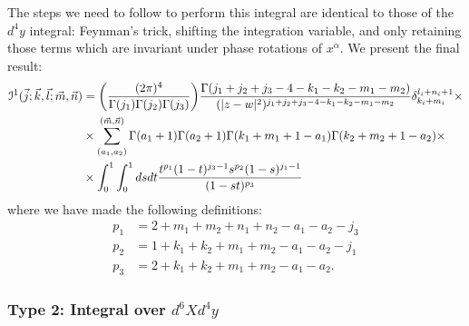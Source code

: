 \documentclass[a4paper,11pt]{article}
\begin{document}
The steps we need to follow to perform this integral are identical to those of the $d^4y$
integral: Feynman’s trick, shifting the integration variable, and only retaining those terms which are invariant under phase rotations of $x^{\dot{\alpha}}$. We present the final result:
\begingroup \allowdisplaybreaks \begin{align}
\mathcal{I}^1(\vec{j};\vec{k},\vec{l};\vec{m}, \vec{n}) &= \bigg(\frac{(2\pi)^4}{\Gamma(j_1) \Gamma(j_2) \Gamma(j_3)}\bigg) \frac{\Gamma(j_1+j_2+j_3-4-k_1-k_2-m_1-m_2)}{(\vert z-w \vert^2)^{j_1+j_2+j_3-4-k_1-k_2-m_1-m_2}} \delta_{k_i+m_i}^{l_i+n_i+1} \times \notag \\
&\times \sum_{(a_1,a_2)}^{(\vec{m},\vec{n})} \Gamma(a_1+1) \Gamma(a_2+1) \Gamma(k_1+m_1+1-a_1) \Gamma(k_2+m_2+1-a_2) \times \notag \\
&\times \int_0^1 \int_0^1 ds dt \frac{t^{p_1} (1-t)^{j_3-1} s^{p_2} (1-s)^{j_1-1}}{(1-st)^{p_3}}
\end{align} \endgroup
where we have made the following definitions:
\begingroup \allowdisplaybreaks \begin{align}
    p_1 &= 2+m_1+m_2+n_1+n_2-a_1-a_2-j_3 \\ p_2 &= 1+k_1+k_2+m_1+m_2-a_1-a_2-j_1 \\ p_3 &= 2+k_1+k_2+m_1+m_2-a_1-a_2.
\end{align} \endgroup

\subsubsection{Type 2: Integral over $d^6X d^4y$}
\end{document}
